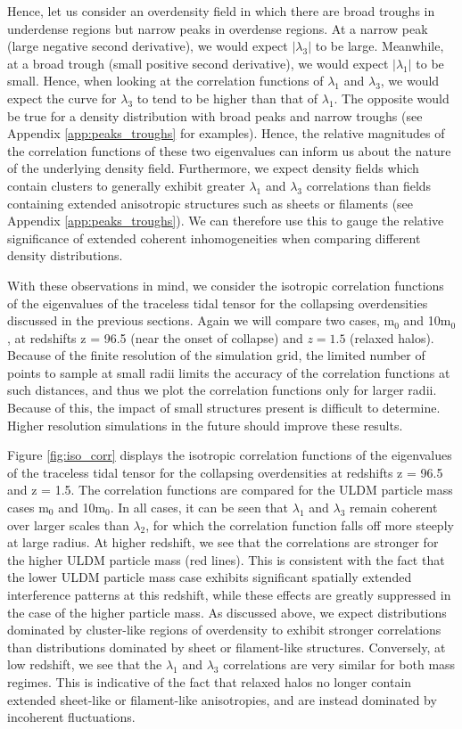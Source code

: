 \documentclass[a4paper,11pt]{article}
\begin{document}
Hence, let us consider an overdensity field in which there are broad troughs in underdense regions but narrow peaks in overdense regions. At a narrow peak (large negative second derivative), we would expect $\vert \lambda_3 \vert$ to be large. Meanwhile, at a broad trough (small positive second derivative), we would expect $\vert \lambda_1 \vert$ to be small. Hence, when looking at the correlation functions of $\lambda_1$ and $\lambda_3$, we would expect the curve for $\lambda_3$ to tend to be higher than that of $\lambda_1$. The opposite would be true for a density distribution with broad peaks and narrow troughs (see Appendix \ref{app:peaks_troughs} for examples). Hence, the relative magnitudes of the correlation functions of these two eigenvalues can inform us about the nature of the underlying density field. Furthermore, we expect density fields which contain clusters to generally exhibit greater $\lambda_1$ and $\lambda_3$ correlations than fields containing extended anisotropic structures such as sheets or filaments (see Appendix \ref{app:peaks_troughs}). We can therefore use this to gauge the relative significance of extended coherent inhomogeneities when comparing different density distributions. 

With these observations in mind, we consider the isotropic correlation functions of the eigenvalues of the traceless tidal tensor for the collapsing overdensities discussed in the previous sections. Again we will compare two cases, m$_0$ and 10m$_0$, at redshifts z = 96.5 (near the onset of collapse) and $z = 1.5$ (relaxed halos). Because of the finite resolution of the simulation grid, the limited number of points to sample at small radii limits the accuracy of the correlation functions at such distances, and thus we plot the correlation functions only for larger radii. Because of this, the impact of small structures present is difficult to determine. Higher resolution simulations in the future should improve these results.  

Figure \ref{fig:iso_corr} displays the isotropic correlation functions of the eigenvalues of the traceless tidal tensor for the collapsing overdensities at redshifts z = 96.5 and z = 1.5. The correlation functions are compared for the ULDM particle mass cases m$_0$ and 10m$_0$. In all cases, it can be seen that $\lambda_1$ and $\lambda_3$ remain coherent over larger scales than $\lambda_2$, for which the correlation function falls off more steeply at large radius. At higher redshift, we see that the correlations are stronger for the higher ULDM particle mass (red lines). This is consistent with the fact that the lower ULDM particle mass case exhibits significant spatially extended interference patterns at this redshift, while these effects are greatly suppressed in the case of the higher particle mass. As discussed above, we expect distributions dominated by cluster-like regions of overdensity to exhibit stronger correlations than distributions dominated by sheet or filament-like structures. Conversely, at low redshift, we see that the $\lambda_1$ and $\lambda_3$ correlations are very similar for both mass regimes. This is indicative of the fact that relaxed halos no longer contain extended sheet-like or filament-like anisotropies, and are instead dominated by incoherent fluctuations. 
\end{document}
